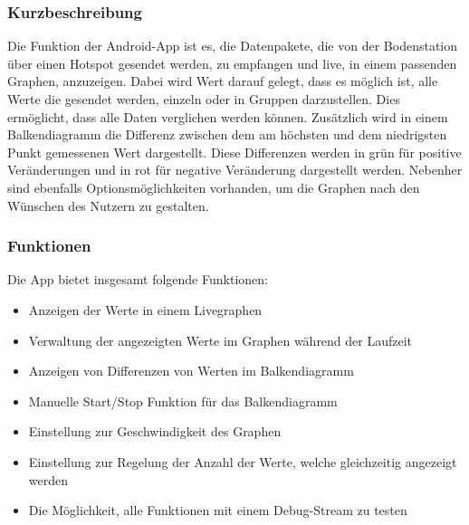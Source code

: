 \subsubsection{Kurzbeschreibung}
Die Funktion der Android-App ist es, die Datenpakete, die von der Bodenstation über einen Hotspot gesendet werden, zu empfangen und live, in einem passenden Graphen, anzuzeigen. Dabei wird Wert darauf gelegt, dass es möglich ist, alle Werte die gesendet werden, einzeln oder in Gruppen darzustellen. Dies ermöglicht, dass alle Daten verglichen werden können. Zusätzlich wird in einem Balkendiagramm die Differenz zwischen dem am höchsten und dem niedrigsten Punkt gemessenen Wert dargestellt. Diese Differenzen werden in grün für positive Veränderungen und in rot für negative Veränderung dargestellt werden. Nebenher sind ebenfalls Optionsmöglichkeiten vorhanden, um die Graphen nach den Wünschen des Nutzern zu gestalten.

\subsubsection{Funktionen}
Die App bietet insgesamt folgende Funktionen:
\begin{itemize}
	\item Anzeigen der Werte in einem Livegraphen
	\item Verwaltung der angezeigten Werte im Graphen während der Laufzeit
	\item Anzeigen von Differenzen von Werten im Balkendiagramm
	\item Manuelle Start/Stop Funktion für das Balkendiagramm
	\item Einstellung zur Geschwindigkeit des Graphen
	\item Einstellung zur Regelung der Anzahl der Werte, welche gleichzeitig angezeigt werden
	\item Die Möglichkeit, alle Funktionen mit einem Debug-Stream zu testen
\end{itemize}
